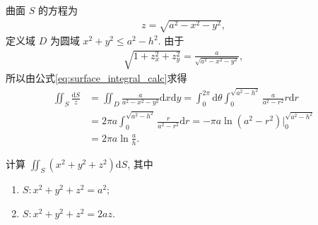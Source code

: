 \documentclass[../../main.tex]{subfiles}%
\begin{document}
\begin{solution}
曲面 $S$ 的方程为
\begin{align*}
z=\sqrt{a^2-x^2-y^2},
\end{align*}
定义域 $D$ 为圆域 $x^2+y^2\leqslant a^2-h^2$. 由于
\begin{align*}
\sqrt{1+z_x^2+z_y^2}=\frac{a}{\sqrt{a^2-x^2-y^2}},
\end{align*}
所以由公式\eqref{eq:surface_integral_calc}求得
\begin{align*}
\iint_S \frac{\mathrm{d}S}{z} &= \iint_D \frac{a}{a^2-x^2-y^2}\mathrm{d}x\mathrm{d}y = \int_0^{2\pi}\mathrm{d}\theta\int_0^{\sqrt{a^2-h^2}}\frac{a}{a^2-r^2}r\mathrm{d}r \\
&= 2\pi a\int_0^{\sqrt{a^2-h^2}}\frac{r}{a^2-r^2}\mathrm{d}r = -\pi a\ln(a^2-r^2)\Big|_0^{\sqrt{a^2-h^2}} \\
&= 2\pi a\ln\frac{a}{h}.
\end{align*}
\end{solution}

\begin{example}
计算 $\iint_S (x^2+y^2+z^2)\mathrm{d}S$, 其中
\begin{enumerate}[(1)]
\item $S: x^2+y^2+z^2=a^2$;
\item $S: x^2+y^2+z^2=2az$.
\end{enumerate}
\end{example}
\end{document}
